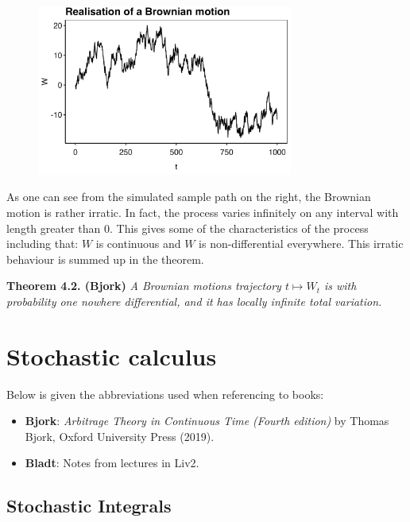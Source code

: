 \documentclass[a4paper,10pt,openany]{book}
\providecommand{\tightlist}{%
 \setlength{\itemsep}{0pt}\setlength{\parskip}{0pt}}
\begin{document}
\begin{figure}[H]
  \begin{center}
    \includegraphics[width=0.75\textwidth]{figures/BM_sim.png}
  \end{center}
\end{figure}

As one can see from the simulated sample path on the right, the Brownian motion is rather irratic. In fact, the process varies infinitely on any interval with length greater than 0. This gives some of the characteristics of the process including that: \(W\) is continuous and \(W\) is non-differential everywhere. This irratic behaviour is summed up in the theorem.

\textbf{Theorem 4.2. (Bjork)} \emph{A Brownian motions trajectory \(t\mapsto W_t\) is with probability one nowhere differential, and it has locally infinite total variation.}

\hypertarget{stochastic-calculus}{%
\chapter{Stochastic calculus}\label{stochastic-calculus}}

Below is given the abbreviations used when referencing to books:

\begin{itemize}
\tightlist
\item
  \textbf{Bjork}: \emph{Arbitrage Theory in Continuous Time (Fourth edition)} by Thomas Bjork, Oxford University Press (2019).\cite{bjork2009}
\item
  \textbf{Bladt}: Notes from lectures in Liv2.
\end{itemize}

\hypertarget{stochastic-integrals}{%
\section{Stochastic Integrals}\label{stochastic-integrals}}
\end{document}
